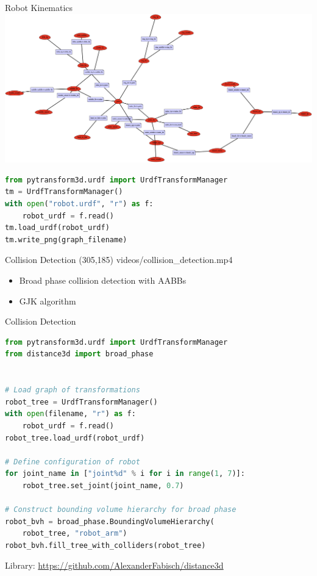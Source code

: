 \documentclass[14pt]{beamer}
\begin{document}
\begin{frame}[fragile]{Robot Kinematics}
\includegraphics[width=\textwidth]{images/embodiment_graph}
\begin{lstlisting}[language=Python]
from pytransform3d.urdf import UrdfTransformManager
tm = UrdfTransformManager()
with open("robot.urdf", "r") as f:
    robot_urdf = f.read()
tm.load_urdf(robot_urdf)
tm.write_png(graph_filename)
\end{lstlisting}
\end{frame}

\begin{frame}{Collision Detection}
\makebox(305,185){
{videos/collision_detection.mp4}}
\begin{itemize}
\item Broad phase collision detection with AABBs
\item GJK algorithm \parencite{Gilbert1988}
\end{itemize}
\end{frame}

\begin{frame}[fragile]{Collision Detection}
\begin{lstlisting}[language=Python]
from pytransform3d.urdf import UrdfTransformManager
from distance3d import broad_phase


# Load graph of transformations
robot_tree = UrdfTransformManager()
with open(filename, "r") as f:
    robot_urdf = f.read()
robot_tree.load_urdf(robot_urdf)

# Define configuration of robot
for joint_name in ["joint%d" % i for i in range(1, 7)]:
    robot_tree.set_joint(joint_name, 0.7)

# Construct bounding volume hierarchy for broad phase
robot_bvh = broad_phase.BoundingVolumeHierarchy(
    robot_tree, "robot_arm")
robot_bvh.fill_tree_with_colliders(robot_tree)
\end{lstlisting}
{\footnotesize Library: \url{https://github.com/AlexanderFabisch/distance3d}}
\end{frame}
\end{document}

